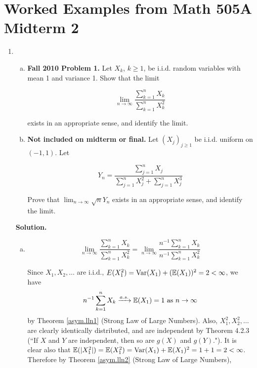 \section{Worked Examples from Math 505A Midterm 2}

\begin{enumerate}[(1)]

\item



\begin{enumerate}[(a)]

\item  \textbf{Fall 2010 Problem 1.} Let \(X_k\), \(k \geq 1\), be i.i.d. random variables with mean 1 and variance 1. Show that the limit

\[
\lim_{n \to \infty} \frac{\sum_{k=1}^n X_k}{\sum_{k=1}^n X_k^2} 
\]

exists in an appropriate sense, and identify the limit.

\item \textbf{Not included on midterm or final.} Let \((X_j)_{j \geq 1}\) be i.i.d. uniform on \((-1, 1)\). Let 

\[
Y_n = \frac{\sum_{j=1}^n X_j}{\sum_{j=1}^n X_j^2 + \sum_{j=1}^n X_j^3} 
\]

Prove that \(\lim_{n \to \infty} \sqrt{n} Y_n\) exists in an appropriate sense, and identify the limit.

\end{enumerate}

\textbf{Solution.} \begin{enumerate}[(a)]

\item 


\[
\lim_{n \to \infty} \frac{\sum_{k=1}^n X_k}{\sum_{k=1}^n X_k^2} = \lim_{n \to \infty} \frac{n^{-1}\sum_{k=1}^n X_k}{n^{-1}\sum_{k=1}^n X_k^2}
\]

Since \(X_1, X_2, \ldots\) are i.i.d., \(E(X_1^2) = \mathrm{Var}(X_1) + (\mathbb{E}(X_1))^2 = 2 < \infty\), we have \[ n^{-1}\sum_{k=1}^n X_k \xrightarrow{a.s.} \mathbb{E}(X_1) = 1 \text{ as } n \to \infty\] by Theorem \ref{asym.lln1} (Strong Law of Large Numbers). Also, \(X_1^2, X_2^2, \ldots\) are clearly identically distributed, and are independent by Theorem 4.2.3 (``If \(X\) and \(Y\) are independent, then so are \(g(X)\) and \(g(Y)\)."). It is clear also that \(\mathbb{E}(|X_1^2|) = \mathbb{E}(X_1^2) = \mathrm{Var}(X_1) + \mathbb{E}(X_1)^2 = 1 + 1 = 2 < \infty\). Therefore by Theorem \ref{asym.lln2} (Strong Law of Large Numbers),  


\end{enumerate}
\end{enumerate}

